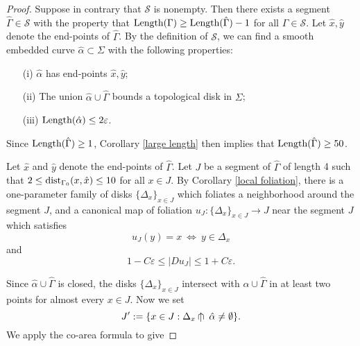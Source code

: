 \documentclass[a4paper, reqno]{amsart}
\theoremstyle{definition}
\theoremstyle{remark}
\numberwithin{equation}{section}
\newcommand{\dist}{\textup{dist}}
\newcommand{\tcap}{\cap\kern-0.7em|\kern0.7em}
\newcommand{\Len}{\textup{Length}}
\numberwithin{equation}{section}
\numberwithin{equation}{section}
\begin{document}
\begin{proof} 

Suppose in contrary that $\mathcal{S}$ is nonempty. Then there exists a segment $\hat{\Gamma}\in\mathcal{S}$ with the property that $\Len(\Gamma)\geq\Len(\hat{\Gamma}) - 1$ for all $\Gamma\in\mathcal{S}$. Let $\hat{x}, \hat{y}$ denote the end-points of $\hat{\Gamma}$. By the definition of $\mathcal{S}$, we can find a smooth embedded curve $\hat{\alpha}\subset\Sigma$ with the following properties:

\begin{itemize}
\item[(i)] $\hat{\alpha}$ has end-points $\hat{x}, \hat{y}$;
\item[(ii)] The union $\hat{\alpha}\cup\hat{\Gamma}$ bounds a topological disk in $\Sigma$;
\item[(iii)] $\Len(\hat{\alpha})\leq 2\varepsilon$.
\end{itemize}
Since $\Len(\hat{\Gamma})\geq 1$, Corollary \ref{large length} then implies that $\Len(\hat{\Gamma})\geq 50$.


Let $\hat{x}$ and $\hat{y}$ denote the end-points of $\hat{\Gamma}$. Let $J$ be a segment of $\hat{\Gamma}$ of length 4 such that $2\leq\dist_{\Gamma_0}(x, \hat{x})\leq 10$ for all $x\in J$. By Corollary \ref{local foliation}, there is a one-parameter family of disks $ \{\Delta_x\}_{x\in J}$ which foliates a neighborhood around the segment $J$, and a canonical map of foliation $u_{J}: \{\Delta_x\}_{x\in J}\to J$ near the segment $J$ which satisfies 
\[ u_{J}(y) = x\ \iff\ y\in \Delta_x\]
and 
	\[ 1 - C\varepsilon \leq |Du_{J}| \leq 1 + C\varepsilon.\]
				
		Since $\hat{\alpha}\cup\hat{\Gamma}$ is closed, the disks $\{\Delta_x\}_{x\in J}$ intersect with $\hat{\alpha}\cup\hat{\Gamma}$ in at least two points for almost every $x\in J$. Now we set
		\[J' := \{x\in J: \Delta_x\tcap\hat{\alpha} \neq \emptyset\}.\]
		We apply the co-area formula to give
		

\end{proof}
\end{document}
